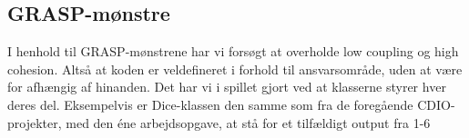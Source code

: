 \subsection{GRASP-mønstre}

I henhold til GRASP-mønstrene har vi forsøgt at overholde low coupling og high cohesion. Altså at koden er veldefineret i forhold til ansvarsområde, uden at være for afhængig af hinanden. Det har vi i spillet gjort ved at klasserne styrer hver deres del. Eksempelvis er Dice-klassen den samme som fra de foregående CDIO-projekter, med den éne arbejdsopgave, at stå for et tilfældigt output fra 1-6